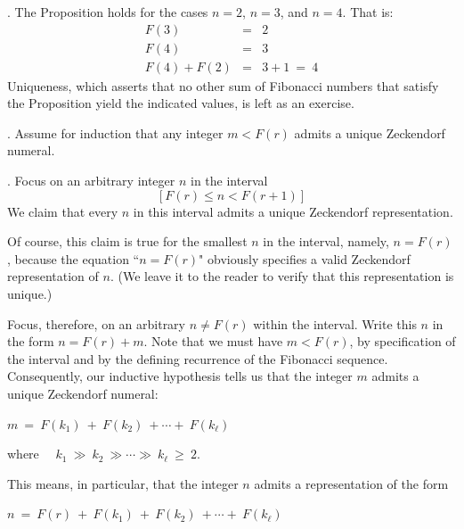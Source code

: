 \medskip

.
The Proposition holds for the cases $n=2$, $n=3$, and $n=4$.  That is:
\begin{eqnarray*}
F(3) & = & 2 \\
F(4) & = & 3 \\
F(4) + F(2) & = & 3 + 1 \ = \ 4
\end{eqnarray*}
Uniqueness, which asserts that no other sum of Fibonacci numbers that satisfy the Proposition yield the indicated values, is left as an exercise.

\medskip

.
Assume for induction that any integer $m < F(r)$ admits a unique Zeckendorf numeral.

\medskip

.
Focus on an arbitrary integer $n$ in the interval
\[ [F(r) \leq n < F(r+1)] \]
We claim that every $n$ in this interval admits a unique Zeckendorf representation.

\smallskip

Of course, this claim is true for the smallest $n$ in the interval, namely, $n=F(r)$, because the equation ``$n=F(r)$" obviously specifies a valid Zeckendorf representation of $n$.  (We leave it to the reader to verify that this representation is unique.)

\smallskip

Focus, therefore, on an arbitrary $n \neq F(r)$ within the interval.  Write this $n$ in the form $n = F(r) + m$.  Note that we must have $m < F(r)$, by specification of the interval and by the defining recurrence of the Fibonacci sequence.  Consequently, our inductive hypothesis tells us that the integer $m$ admits a unique Zeckendorf numeral:

\smallskip

\hspace*{.25in} $m \ = \ F(k_1) \ + \ F(k_2) \ + \cdots + \ F(k_\ell)$

\smallskip

\noindent
where \ \ $k_1 \ \gg \ k_2 \ \gg \cdots \gg \ k_\ell \ \geq \ 2$.

\smallskip

\noindent
This means, in particular, that the integer $n$ admits a representation of the form

\smallskip

\hspace*{.25in} $n \ = \ F(r) \ + \ F(k_1) \ + \ F(k_2) \ + \cdots + \ F(k_\ell)$

